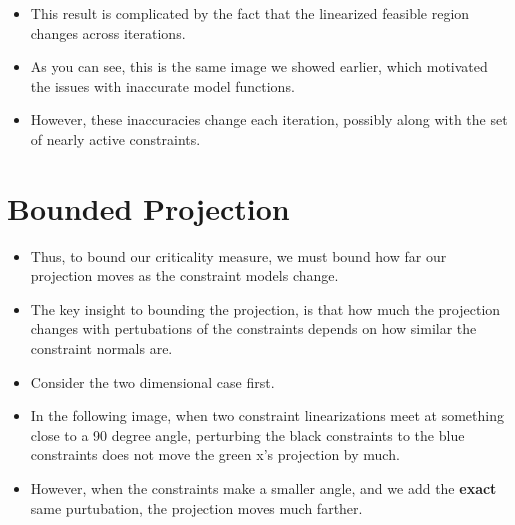 \documentclass{article}
\begin{document}
\hrulefill

\begin{itemize}
\item This result is complicated by the fact that the linearized feasible region changes across iterations.
\item As you can see, this is the same image we showed earlier, which motivated the issues with inaccurate model functions.
\item However, these inaccuracies change each iteration, possibly along with the set of nearly active constraints.
\end{itemize}


	\section{Bounded Projection}
\begin{itemize}
\item Thus, to bound our criticality measure, we must bound how far our projection moves as the constraint models change.
\item The key insight to bounding the projection, is that how much the projection changes with pertubations of the constraints depends on how similar the constraint normals are.
\item Consider the two dimensional case first.
\item In the following image, when two constraint linearizations meet at something close to a 90 degree angle, perturbing the black constraints to the blue constraints does not move the green x's projection by much.
\end{itemize}

\hrulefill

\begin{itemize}
\item However, when the constraints make a smaller angle, and we add the \textbf{exact} same purtubation, the projection moves much farther.
\end{itemize}

\hrulefill
\end{document}
